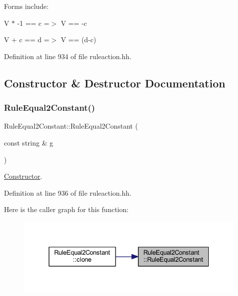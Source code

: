Forms include\+:
\begin{DoxyItemize}
\item {\ttfamily V $\ast$ -\/1 == c =$>$ V == -\/c}
\item {\ttfamily V + c == d =$>$ V == (d-\/c)} 
\end{DoxyItemize}

Definition at line 934 of file ruleaction.\+hh.



\subsection{Constructor \& Destructor Documentation}
\mbox{\label{class_rule_equal2_constant_a72c73531b7c0243dde3a1ae23eeea678}} 
\subsubsection{\texorpdfstring{RuleEqual2Constant()}{RuleEqual2Constant()}}
{\footnotesize\ttfamily Rule\+Equal2\+Constant\+::\+Rule\+Equal2\+Constant (\begin{DoxyParamCaption}\item[{const string \&}]{g }\end{DoxyParamCaption})\hspace{0.3cm}{\ttfamily [inline]}}



\mbox{\hyperlink{class_constructor}{Constructor}}. 



Definition at line 936 of file ruleaction.\+hh.

Here is the caller graph for this function\+:
\nopagebreak
\begin{figure}[H]
\begin{center}
\leavevmode
\includegraphics[width=332pt]{class_rule_equal2_constant_a72c73531b7c0243dde3a1ae23eeea678_icgraph}
\end{center}
\end{figure}


